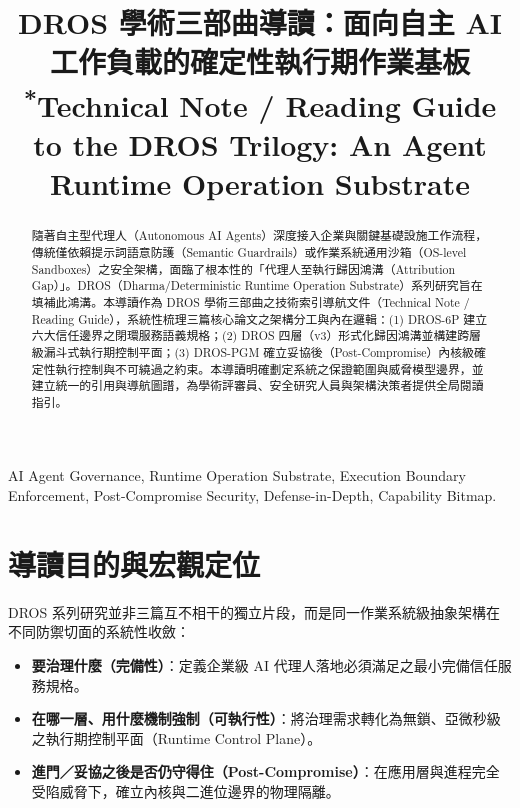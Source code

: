\documentclass[conference]{IEEEtran}
\begin{document}
\title{DROS 學術三部曲導讀：面向自主 AI 工作負載的確定性執行期作業基板\\
{\footnotesize \textsuperscript{*}Technical Note / Reading Guide to the DROS Trilogy: An Agent Runtime Operation Substrate}}

\author{
}

\maketitle
\thispagestyle{plain}
\pagestyle{plain}

\begin{abstract}
隨著自主型代理人（Autonomous AI Agents）深度接入企業與關鍵基礎設施工作流程，傳統僅依賴提示詞語意防護（Semantic Guardrails）或作業系統通用沙箱（OS-level Sandboxes）之安全架構，面臨了根本性的「代理人至執行歸因鴻溝（Attribution Gap）」。DROS（Dharma/Deterministic Runtime Operation Substrate）系列研究旨在填補此鴻溝。本導讀作為 DROS 學術三部曲之技術索引導航文件（Technical Note / Reading Guide），系統性梳理三篇核心論文之架構分工與內在邏輯：(1) DROS-6P 建立六大信任邊界之閉環服務語義規格；(2) DROS 四層（v3）形式化歸因鴻溝並構建跨層級漏斗式執行期控制平面；(3) DROS-PGM 確立妥協後（Post-Compromise）內核級確定性執行控制與不可繞過之約束。本導讀明確劃定系統之保證範圍與威脅模型邊界，並建立統一的引用與導航圖譜，為學術評審員、安全研究人員與架構決策者提供全局閱讀指引。
\end{abstract}

\begin{IEEEkeywords}
AI Agent Governance, Runtime Operation Substrate, Execution Boundary Enforcement, Post-Compromise Security, Defense-in-Depth, Capability Bitmap.
\end{IEEEkeywords}

\section{導讀目的與宏觀定位}
DROS 系列研究並非三篇互不相干的獨立片段，而是同一作業系統級抽象架構在不同防禦切面的系統性收斂：
\begin{itemize}
    \item \textbf{要治理什麼（完備性）}：定義企業級 AI 代理人落地必須滿足之最小完備信任服務規格。
    \item \textbf{在哪一層、用什麼機制強制（可執行性）}：將治理需求轉化為無鎖、亞微秒級之執行期控制平面（Runtime Control Plane）。
    \item \textbf{進門／妥協之後是否仍守得住（Post-Compromise）}：在應用層與進程完全受陷威脅下，確立內核與二進位邊界的物理隔離。
\end{itemize}
\end{document}
